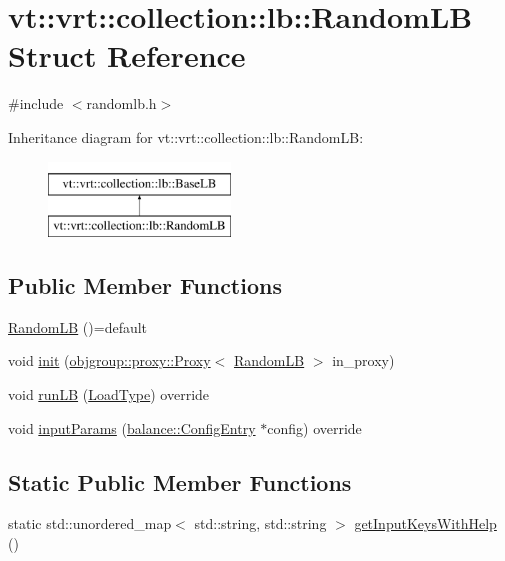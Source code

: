 \hypertarget{structvt_1_1vrt_1_1collection_1_1lb_1_1_random_l_b}{}\section{vt\+:\+:vrt\+:\+:collection\+:\+:lb\+:\+:Random\+LB Struct Reference}
\label{structvt_1_1vrt_1_1collection_1_1lb_1_1_random_l_b}


{\ttfamily \#include $<$randomlb.\+h$>$}

Inheritance diagram for vt\+:\+:vrt\+:\+:collection\+:\+:lb\+:\+:Random\+LB\+:\begin{figure}[H]
\begin{center}
\leavevmode
\includegraphics[height=2.000000cm]{structvt_1_1vrt_1_1collection_1_1lb_1_1_random_l_b}
\end{center}
\end{figure}
\subsection*{Public Member Functions}
\begin{DoxyCompactItemize}
\item 
\hyperlink{structvt_1_1vrt_1_1collection_1_1lb_1_1_random_l_b_ac6bf4ed6fb55fb787478c5f00d68f20c}{Random\+LB} ()=default
\item 
void \hyperlink{structvt_1_1vrt_1_1collection_1_1lb_1_1_random_l_b_a1b9a24043e9a971fc3acb47233028ca8}{init} (\hyperlink{structvt_1_1objgroup_1_1proxy_1_1_proxy}{objgroup\+::proxy\+::\+Proxy}$<$ \hyperlink{structvt_1_1vrt_1_1collection_1_1lb_1_1_random_l_b}{Random\+LB} $>$ in\+\_\+proxy)
\item 
void \hyperlink{structvt_1_1vrt_1_1collection_1_1lb_1_1_random_l_b_a9cf59256d2c69208326310f3f8dcd3e8}{run\+LB} (\hyperlink{namespacevt_a8fb51741340b87d7aaee0bef60e9896b}{Load\+Type}) override
\item 
void \hyperlink{structvt_1_1vrt_1_1collection_1_1lb_1_1_random_l_b_a19a7f9317660253f4fd7f3883c2e4e96}{input\+Params} (\hyperlink{structvt_1_1vrt_1_1collection_1_1balance_1_1_config_entry}{balance\+::\+Config\+Entry} $\ast$config) override
\end{DoxyCompactItemize}
\subsection*{Static Public Member Functions}
\begin{DoxyCompactItemize}
\item 
static std\+::unordered\+\_\+map$<$ std\+::string, std\+::string $>$ \hyperlink{structvt_1_1vrt_1_1collection_1_1lb_1_1_random_l_b_a82f4963022fe65edd8dcd30e53525e07}{get\+Input\+Keys\+With\+Help} ()
\end{DoxyCompactItemize}
